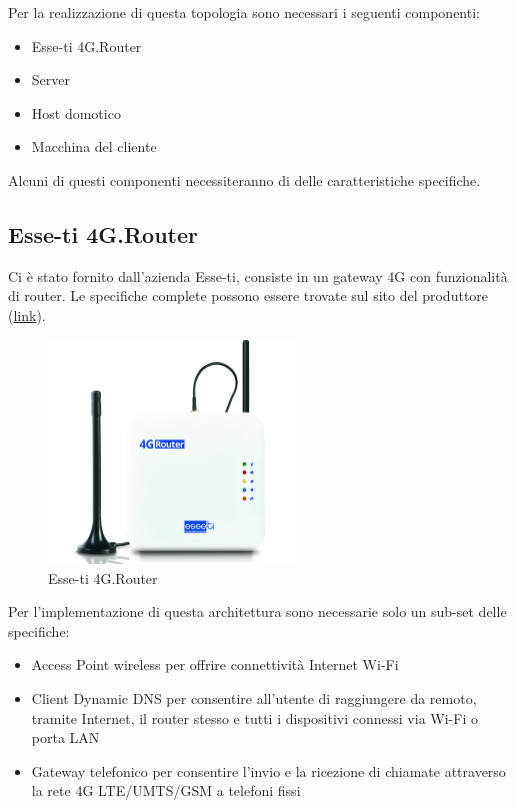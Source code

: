 
Per la realizzazione di questa topologia sono necessari i seguenti componenti:

\begin{itemize}
	\item Esse-ti 4G.Router
	\item Server
	\item Host domotico
	\item Macchina del cliente
\end{itemize}

Alcuni di questi componenti necessiteranno di delle caratteristiche specifiche.

\subsection{Esse-ti 4G.Router}

Ci è stato fornito dall'azienda Esse-ti, consiste in un gateway 4G con funzionalità di router. Le specifiche complete possono essere trovate sul sito del produttore (\href{https://www.esse-ti.it/4g-router}{link}).


\begin{figure}[ht]
	\centering
	\includegraphics[width=250px]{immagini/4grouter.jpg}
	\caption{Esse-ti 4G.Router}
	\label{fig:esse-ti-router-4g}
\end{figure}

Per l'implementazione di questa architettura sono necessarie solo un sub-set delle specifiche:

\begin{itemize}
	\item Access Point wireless per offrire connettività Internet Wi-Fi
 
	\item Client Dynamic DNS per consentire all’utente di raggiungere da remoto, tramite Internet, il router stesso e tutti i dispositivi connessi via Wi-Fi o porta LAN
	
	\item Gateway telefonico per consentire l’invio e la ricezione di chiamate attraverso la rete 4G LTE/UMTS/GSM a telefoni fissi
\end{itemize}

